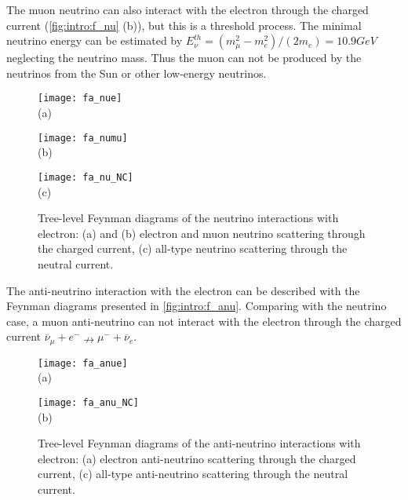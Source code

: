 \documentclass[../main.tex]{subfiles}
\begin{document}
The muon neutrino can also interact with the electron through the charged current (\autoref{fig:intro:f_nu} (b)), but this is a threshold process. The minimal neutrino energy can be estimated by $E_\nu^{th}=\left(m_\mu^2-m_e^2\right)/\left(2m_e\right)=10.9GeV$ neglecting the neutrino mass. Thus the muon can not be produced by the neutrinos from the Sun or other low-energy neutrinos.

\begin{figure}[!ht]
\centering
  \begin{minipage}[t]{0.29\linewidth}
    \centering
    \texttt{[image: fa\_nue]} \\ (a)
  \end{minipage}
  \begin{minipage}[t]{0.29\linewidth}
    \centering
    \texttt{[image: fa\_numu]} \\ (b)
  \end{minipage}
  \begin{minipage}[t]{0.29\linewidth}
    \centering
    \texttt{[image: fa\_nu\_NC]} \\ (c)
  \end{minipage}
  \caption{Tree-level Feynman diagrams of the neutrino interactions with electron: (a) and (b) electron and muon neutrino scattering through the charged current, (c) all-type neutrino scattering through the neutral current.}
  \label{fig:intro:f_nu}
\end{figure}

The anti-neutrino interaction with the electron can be described with the Feynman diagrams presented in \autoref{fig:intro:f_anu}. Comparing with the neutrino case, a muon anti-neutrino can not interact with the electron through the charged current $\overline{\nu}_\mu+ e^-\nrightarrow \mu^-+\overline{\nu}_e$.

\begin{figure}[!ht]
\centering
  \begin{minipage}[t]{0.29\linewidth}
    \centering
    \texttt{[image: fa\_anue]} \\ (a)
  \end{minipage}
  \begin{minipage}[t]{0.29\linewidth}
    \centering
    \texttt{[image: fa\_anu\_NC]} \\ (b)
    \end{minipage}
  \caption{Tree-level Feynman diagrams of the anti-neutrino interactions with electron: (a) electron anti-neutrino scattering through the charged current, (c) all-type anti-neutrino scattering through the neutral current.}
  \label{fig:intro:f_anu}
\end{figure}
\end{document}
